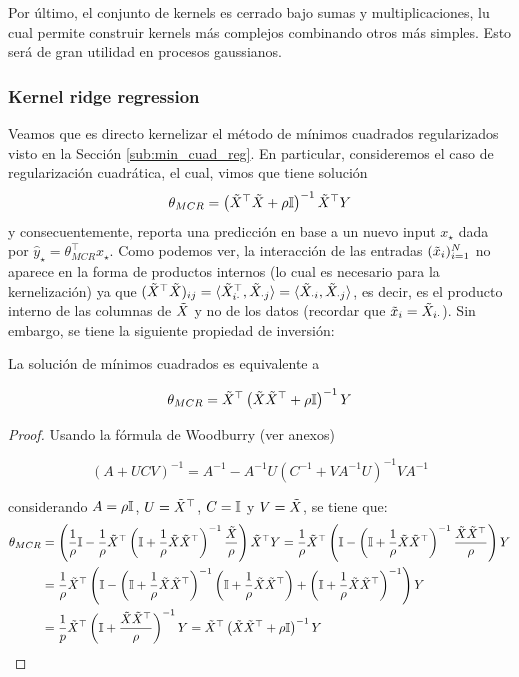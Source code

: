 Por último, el conjunto de kernels es cerrado bajo sumas y multiplicaciones, lu cual permite construir kernels más complejos combinando otros más simples. Esto será de gran utilidad en procesos gaussianos.

\subsubsection{Kernel ridge regression}

Veamos que es directo kernelizar el método de mínimos cuadrados regularizados visto en la Sección \ref{sub:min_cuad_reg}. En particular, consideremos el caso de regularización cuadrática, el cual, vimos que tiene solución
\begin{equation}
    \theta_{MCR} = \left(\tilde{X}^\top\tilde{X} +\rho {\mathbb I}\right)^{-1} \tilde{X}^\top Y
    \label{eq:RR_soln1}
\end{equation}
 y consecuentemente, reporta una predicción en base a un nuevo input $x_\star$ dada por $\hat{y}_\star = \theta_{MCR}^\top x_\star$. Como podemos ver, la interacción de las entradas $(\tilde{x}_i)_{i=1}^N$ no aparece en la forma de productos internos (lo cual es necesario para la kernelización) ya que $(\tilde{X}^\top\tilde{X})_{ij}=\langle\tilde{X}^\top_{i\cdot},\tilde{X}_{\cdot j}\rangle=\langle\tilde{X}_{\cdot i},\tilde{X}_{\cdot j}\rangle$, es decir, es el producto interno de las columnas de $\tilde{X}$ y no de los datos (recordar que $\tilde{x}_i = \tilde{X}_{i\cdot}$). Sin embargo, se tiene la siguiente propiedad de inversión:

\begin{lemma} La solución de mínimos cuadrados es equivalente a

\begin{equation}
    \theta_{MCR} = \tilde{X}^\top\left(\tilde{X}\tilde{X}^\top + \rho{\mathbb I}\right)^{-1}Y
    \label{eq:RR_soln2}
\end{equation}

\end{lemma}

\begin{proof}
    Usando la fórmula de Woodburry (ver anexos)
    
    \begin{equation}
        (A+UCV)^{-1} = A^{-1} - A^{-1}U(C^{-1}+VA^{-1}U)^{-1}VA^{-1}
    \end{equation}
    
considerando $A=\rho{\mathbb I}$, $U=\tilde{X}^\top$, $C={\mathbb I}$ y $V=\tilde{X}$, se tiene que:
\begin{align}
    \theta_{MCR} &= \left(\frac{1}{\rho}{\mathbb I}- \frac{1}{\rho}\tilde{X}^\top\left({\mathbb I}+\frac{1}{\rho}\tilde{X}\tilde{X}^\top\right)^{-1}\frac{\tilde{X}}{\rho}\right)\tilde{X}^\top Y=\frac{1}{\rho}\tilde{X}^\top \left({\mathbb I}- \left({\mathbb I}+\frac{1}{\rho}\tilde{X}\tilde{X}^\top\right)^{-1}\frac{\tilde{X}\tilde{X}^\top}{\rho}\right)Y\\
    &= \frac{1}{\rho}\tilde{X}^\top \left({\mathbb I}- \left({\mathbb I}+\frac{1}{\rho}\tilde{X}\tilde{X}^\top\right)^{-1}\left({\mathbb I}+\frac{1}{\rho}\tilde{X}\tilde{X}^\top\right) + \left({\mathbb I}+\frac{1}{\rho}\tilde{X}\tilde{X}^\top\right)^{-1}\right)Y\\
    &= \frac{1}{p}\tilde{X}^\top\left({\mathbb I}+\frac{\tilde{X}\tilde{X}^\top}{\rho}\right)^{-1}Y= \tilde{X}^\top\left(\tilde{X}\tilde{X}^\top + \rho{\mathbb I}\right)^{-1}Y
\end{align}
\end{proof}

